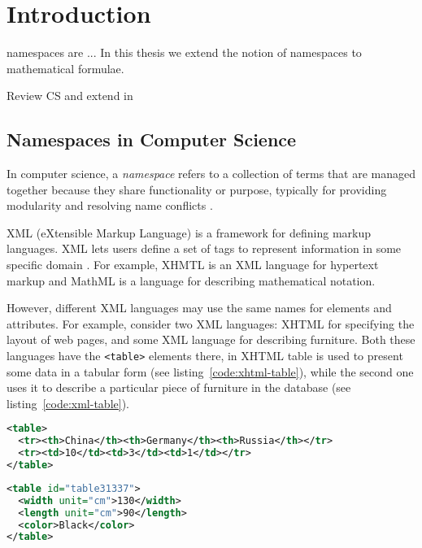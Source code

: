 \section{Introduction}

namespaces are ... 
In this thesis we extend the notion of namespaces to mathematical formulae. 

Review CS and extend in 

\subsection{Namespaces in Computer Science}

In computer science, a \emph{namespace} refers to a collection of terms that are managed
together because they share functionality or purpose, typically for providing modularity
and resolving name conflicts \cite{duval2002metadata}.


XML (eXtensible Markup Language) is a framework for defining markup languages.
XML lets users define a set of tags to represent information in some
specific domain \cite{moller2006introduction}. For example, XHMTL is an XML
language for hypertext markup and MathML is a language for describing mathematical
notation. 

However, different XML languages may use the same names for elements and attributes. 
For example, consider two XML languages: XHTML for specifying the layout of web 
pages, and some XML language for describing furniture. Both these languages have 
the \verb|<table>| elements there, in XHTML table is used to present some data in 
a tabular form (see listing~\ref{code:xhtml-table}), 
while the second one uses it to describe a particular piece of
furniture in the database (see listing~\ref{code:xml-table}). 

\begin{lstlisting}[language=XML,caption={Describing tabular data in XHTML with 
the \texttt{<table>} tag},label={code:xhtml-table}]
<table>
  <tr><th>China</th><th>Germany</th><th>Russia</th></tr>
  <tr><td>10</td><td>3</td><td>1</td></tr>
</table>
\end{lstlisting}

\begin{lstlisting}[language=XML,caption={The \texttt{<table>} tag in an XML language for describing furniture},label={code:xml-table}]
<table id="table31337"> 
  <width unit="cm">130</width>
  <length unit="cm">90</length>
  <color>Black</color>
</table>
\end{lstlisting}

